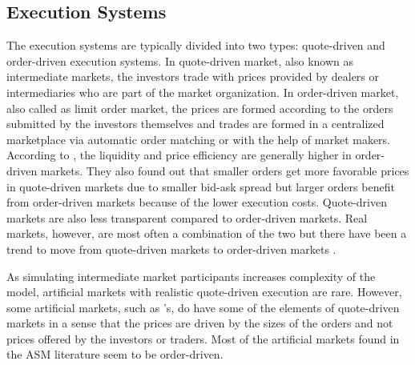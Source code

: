 \subsection{Execution Systems}
The execution systems are typically divided into two types:
quote-driven and order-driven execution systems. In quote-driven market, also known
as intermediate markets, the investors trade with prices provided 
by dealers or intermediaries who are part of the market organization. 
In order-driven market, also called as limit order market, 
the prices are formed according to the orders submitted by the 
investors themselves and trades are formed in a centralized marketplace 
via automatic order matching or with the help of market makers. 
\citep{Baru17} According to \citet{MALINOVA2013104},
the liquidity and price efficiency are generally higher in order-driven 
markets. They also found out that smaller orders get more favorable prices in 
quote-driven markets due to smaller bid-ask spread 
but larger orders benefit from order-driven markets because of the lower 
execution costs. Quote-driven markets are also less transparent compared
to order-driven markets. Real markets, however, are most often a combination
of the two \citep{boer05} but there have been a trend to move from quote-driven
markets to order-driven markets \citep{MALINOVA2013104}.

As simulating intermediate market participants increases complexity
of the model, artificial markets with realistic quote-driven execution are rare. 
However, some artificial markets, such as \citet{SantaFe99}'s, do have some of 
the elements of quote-driven markets in a sense that the prices are driven by 
the sizes of the orders and not prices offered by the investors or traders. 
Most of the artificial markets found in the ASM literature seem to be order-driven.

